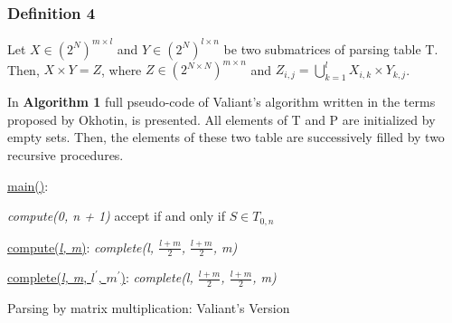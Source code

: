 \documentclass[runningheads]{llncs}
\begin{document}
\subsubsection{Definition 4} Let $X \in (2^N)^{m \times l}$ and $Y \in (2^N)^{l \times n}$ be two submatrices of parsing table T. Then, $X \times Y = Z$, where $Z \in (2^{N \times N})^{m \times n}$ and $Z_{i, j} = \bigcup\limits_{k = 1}^{l} X_{i, k} \times Y_{k, j}$.


In \textbf{Algorithm 1} full pseudo-code of Valiant's algorithm written in the terms proposed by Okhotin, is presented. All elements of T and P are initialized by empty sets. Then, the elements of these two table are successively filled by two recursive procedures.

\begin{algorithm}
\SetAlgoNoLine
{}
\underline{main()}{:}{
 
 \textit{compute(0, n + 1)\;}
 accept if and only if $S \in T_{0, n}$
 \linebreak
 }
 
\underline{compute(\textit{l, m})}{:}{
 \textit{complete(l, $\frac{l+m}{2}$, $\frac{l+m}{2}$, m)}
 \linebreak
 }
 
\underline{complete(\textit{l, m}, $l^\prime$, $m^\prime$)}{:}{
 }
  \textit{complete(l, $\frac{l+m}{2}$, $\frac{l+m}{2}$, m)}
 
\caption{Parsing by matrix multiplication: Valiant's Version}
\end{algorithm}
\end{document}
